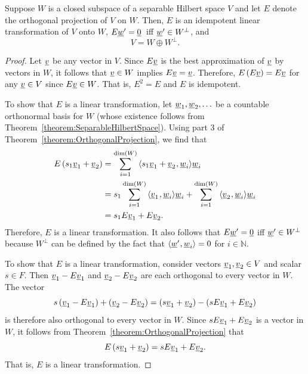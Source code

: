 \begin{theorem} \label{theorem:OrthogonalSubspaceDirectSum}
Suppose $W$ is a closed subspace of a separable Hilbert space $V$ and let $E$ denote the orthogonal projection of $V$ on $W$.
Then, $E$ is an idempotent linear transformation of $V$ onto $W$, $E \underline{w}' = \underline{0}\,$ iff $\underline{w}' \in W^{\bot}$, and
\begin{equation*}
V = W \oplus W^{\bot}.
\end{equation*}
\end{theorem}
\begin{proof}
Let $\underline{v}$ be any vector in $V$.
Since $E \underline{v}$ is the best approximation of $\underline{v}$ by vectors in $W$, it follows that $\underline{v} \in W$ implies $E \underline{v} = \underline{v}$.
Therefore, $E \left( E \underline{v} \right) = E \underline{v}$ for any $\underline{v} \in V$ since $E \underline{v} \in W$.
That is, $E^2 = E$ and $E$ is idempotent.

To show that $E$ is a linear transformation, let $\underline{w}_1 , \underline{w}_2 , \ldots$ be a countable orthonormal basis for $W$ (whose existence follows from Theorem~\ref{theorem:SeparableHilbertSpace}).
Using part 3 of Theorem~\ref{theorem:OrthogonalProjection}, we find that
\begin{align*}
E \left( s_1 \underline{v}_1 + \underline{v}_2 \right)
& = \sum_{i=1}^{\dim (W)} {\langle   s_1 \underline{v}_1 + \underline{v}_2  \mskip1mu ,  \underline{w}_i  \rangle} \underline{w}_i \\
& = s_1 \sum_{i=1}^{\dim (W)} {\langle   \underline{v}_1  \mskip1mu ,  \underline{w}_i  \rangle} \underline{w}_i + \sum_{i=1}^{\dim (W)} {\langle   \underline{v}_2  \mskip1mu ,  \underline{w}_i  \rangle} \underline{w}_i \\
& = s_1 E \underline{v}_1 + E \underline{v}_2.
\end{align*}
Therefore, $E$ is a linear transformation.
It also follows that $E \underline{w}' = \underline{0}$ iff $\underline{w}' \in W^{\bot}$ because $W^{\bot}$ can be defined by the fact that ${\langle  \underline{w}'  \mskip1mu ,  \underline{w}_i  \rangle} = 0$ for $i\in \mathbb{N}$.

\iffalse
To show that $E$ is a linear transformation, consider vectors $\underline{v}_1, \underline{v}_2 \in V$ and scalar $s \in F$.
Then $\underline{v}_1 - E \underline{v}_1$ and $\underline{v}_2 - E \underline{v}_2$ are each orthogonal to every vector in $W$.
The vector
\begin{equation*}
s \left( \underline{v}_1 - E \underline{v}_1 \right) + \left( \underline{v}_2 - E \underline{v}_2 \right) = \left( s \underline{v}_1 + \underline{v}_2 \right) - \left( s E \underline{v}_1 + E \underline{v}_2 \right)
\end{equation*}
is therefore also orthogonal to every vector in $W$.
Since $s E \underline{v}_1 + E \underline{v}_2$ is a vector in $W$, it follows from Theorem~\ref{theorem:OrthogonalProjection} that
\begin{equation*}
E \left( s \underline{v}_1 + \underline{v}_2 \right) = s E \underline{v}_1 + E \underline{v}_2.
\end{equation*}
That is, $E$ is a linear transformation.


\end{proof}
